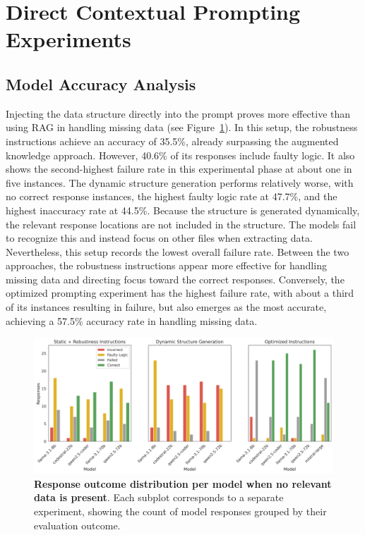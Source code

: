 \documentclass{DESSThesis}
\begin{document}
\section{Direct Contextual Prompting Experiments}

\subsection{Model Accuracy Analysis}

Injecting the data structure directly into the prompt proves more effective than using RAG in handling missing data (see Figure~\ref{fig:outcome_distribution_nodata_second}). In this setup, the robustness instructions achieve an accuracy of 35.5\%, already surpassing the augmented knowledge approach. However, 40.6\% of its responses include faulty logic. It also shows the second-highest failure rate in this experimental phase at about one in five instances. The dynamic structure generation performs relatively worse, with no correct response instances, the highest faulty logic rate at 47.7\%, and the highest inaccuracy rate at 44.5\%. Because the structure is generated dynamically, the relevant response locations are not included in the structure. The models fail to recognize this and instead focus on other files when extracting data. Nevertheless, this setup records the lowest overall failure rate. Between the two approaches, the robustness instructions appear more effective for handling missing data and directing focus toward the correct responses. Conversely, the optimized prompting experiment has the highest failure rate, with about a third of its instances resulting in failure, but also emerges as the most accurate, achieving a 57.5\% accuracy rate in handling missing data.

\begin{figure}[ht]
    \centering
    \includegraphics[width=\linewidth]{img/Results/Second Experimental Phase/Response Outcome Distribution per Model - No Data.png}
    \caption[Response outcome distribution per model when no relevant data is present]{\textbf{Response outcome distribution per model when no relevant data is present}. Each subplot corresponds to a separate experiment, showing the count of model responses grouped by their evaluation outcome.}
    \label{fig:outcome_distribution_nodata_second}
\end{figure}
\end{document}
